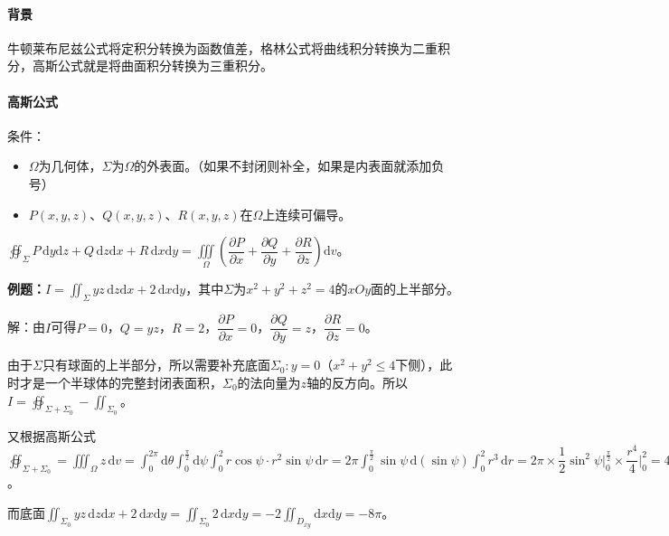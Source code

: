 \documentclass[UTF8, 12pt]{ctexart}
\begin{document}
        \paragraph{背景} \leavevmode \medskip

        牛顿莱布尼兹公式将定积分转换为函数值差，格林公式将曲线积分转换为二重积分，高斯公式就是将曲面积分转换为三重积分。

        \paragraph{高斯公式} \leavevmode \medskip

        条件：

        \begin{itemize}
            \item $\Omega$为几何体，$\Sigma$为$\Omega$的外表面。（如果不封闭则补全，如果是内表面就添加负号）
            \item $P(x,y,z)$、$Q(x,y,z)$、$R(x,y,z)$在$\Omega$上连续可偏导。
        \end{itemize}

        $\displaystyle{\oiint_\Sigma P\,\textrm{d}y\textrm{d}z+Q\,\textrm{d}z\textrm{d}x+R\,\textrm{d}x\textrm{d}y=\iiint\limits_\Omega\left(\dfrac{\partial P}{\partial x}+\dfrac{\partial Q}{\partial y}+\dfrac{\partial R}{\partial z}\right)\textrm{d}v}$。

        \textbf{例题：}$I=\iint_\Sigma yz\,\textrm{d}z\textrm{d}x+2\,\textrm{d}x\textrm{d}y$，其中$\Sigma$为$x^2+y^2+z^2=4$的$xOy$面的上半部分。

        解：由$I$可得$P=0$，$Q=yz$，$R=2$，$\dfrac{\partial P}{\partial x}=0$，$\dfrac{\partial Q}{\partial y}=z$，$\dfrac{\partial R}{\partial z}=0$。

        由于$\Sigma$只有球面的上半部分，所以需要补充底面$\Sigma_0:y=0$（$x^2+y^2\leqslant4$下侧），此时才是一个半球体的完整封闭表面积，$\Sigma_0$的法向量为$z$轴的反方向。所以$I=\oiint_{\Sigma+\Sigma_0}-\iint_{\Sigma_0}$。

        又根据高斯公式$\oiint_{\Sigma+\Sigma_0}=\iiint_\Omega z\,\textrm{d}v=\int_0^{2\pi}\textrm{d}\theta\int_0^{\frac{\pi}{2}}\textrm{d}\psi\int_0^2r\cos\psi\cdot r^2\sin\psi\,\textrm{d}r=2\pi\int_0^{\frac{\pi}{2}}\sin\psi\,\textrm{d}(\sin\psi)\int_0^2r^3\,\textrm{d}r=2\pi\times\dfrac{1}{2}\sin^2\psi\vert_0^{\frac{\pi}{2}}\times\dfrac{r^4}{4}\vert_0^2=4\pi$。

        而底面$\iint_{\Sigma_0}yz\,\textrm{d}z\textrm{d}x+2\,\textrm{d}x\textrm{d}y=\iint_{\Sigma_0}2\,\textrm{d}x\textrm{d}y=-2\iint_{D_{xy}}\textrm{d}x\textrm{d}y=-8\pi$。
\end{document}
